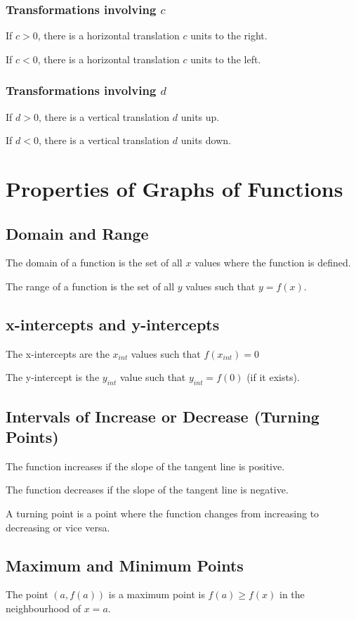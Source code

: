 			\subsubsection{Transformations involving $c$}
				If $c > 0$, there is a horizontal translation $c$ units to the right.

				If $c < 0$, there is a horizontal translation $c$ units to the left.
			\subsubsection{Transformations involving $d$}
				If $d > 0$, there is a vertical translation $d$ units up.

				If $d < 0$, there is a vertical translation $d$ units down.
	\section{Properties of Graphs of Functions}
		\subsection{Domain and Range}
			The domain of a function is the set of all $x$ values where the function is defined.

			The range of a function is the set of all $y$ values such that $y = f(x)$.
		\subsection{x-intercepts and y-intercepts}
			The x-intercepts are the $x_{int}$ values such that $f(x_{int}) = 0$

			The y-intercept is the $y_{int}$ value such that $y_{int} = f(0)$ (if it exists).
		\subsection{Intervals of Increase or Decrease (Turning Points)}
			The function increases if the slope of the tangent line is positive.

			The function decreases if the slope of the tangent line is negative.

			A turning point is a point where the function changes from increasing to decreasing or vice versa.
		\subsection{Maximum and Minimum Points}
			The point $(a, f(a))$ is a maximum point is $f(a) \geq f(x)$ in the neighbourhood of $x=a$.

